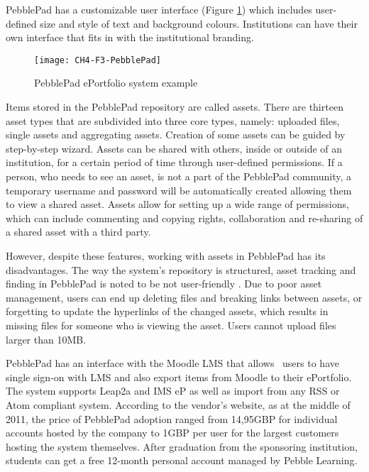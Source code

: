PebblePad has a customizable user interface (Figure \ref{fig:ppep}) which
includes user-defined size and style of text and background colours.
Institutions can have their own interface that fits in with the institutional
branding.

\begin{figure}[htb]
\centering
\texttt{[image: CH4-F3-PebblePad]}
\caption[PebblePad ePortfolio system example]{PebblePad ePortfolio system
example \citep{PebbleLearningLtd}}
\label{fig:ppep}
\end{figure}

Items stored in the PebblePad repository are called assets. There are thirteen
asset types that are subdivided into three core types, namely: uploaded files,
single assets and aggregating assets. Creation of some assets can be guided by
step-by-step wizard. Assets can be shared with others, inside or outside of an
institution, for a certain period of time through user-defined permissions. If a
person, who needs to see an asset, is not a part of the PebblePad community, a
temporary username and password will be automatically created allowing them to
view a shared asset. Assets allow for setting up a wide range of permissions,
which can include commenting and copying rights, collaboration and re-sharing
of a shared asset with a third party.

However, despite these features, working with assets in PebblePad has its
disadvantages. The way the system's repository is structured, asset tracking and
finding in PebblePad is noted to be not user-friendly \citep{Overton2009}. Due
to poor asset management, users can end up deleting files and breaking links
between assets, or forgetting to update the hyperlinks of the changed assets,
which results in missing files for someone who is viewing the asset. Users
cannot upload files larger than 10MB.

PebblePad has an interface with the Moodle LMS that allows \ep~users to have
single sign-on with LMS and also export items from Moodle to their ePortfolio.
The system supports Leap2a and IMS eP as well as import from any RSS or Atom
compliant system. According to the vendor's website, as at the middle of 2011,
the price of PebblePad adoption ranged from 14,95GBP for individual accounts
hosted by the company to 1GBP per user for the largest customers hosting
the system themselves. After graduation from the sponsoring institution,
students can get a free 12-month personal account managed by Pebble Learning.

